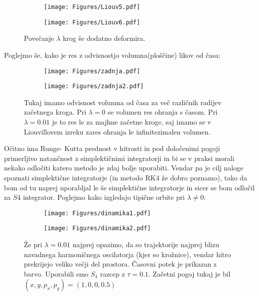 \documentclass{article}
\begin{document}
\begin{figure}[H]
\centering
\begin{subfigure}{.49\textwidth}
\texttt{[image: Figures/Liouv5.pdf]}
\end{subfigure}
\begin{subfigure}{.49\textwidth}
\texttt{[image: Figures/Liouv6.pdf]}
\end{subfigure}
\caption*{Povečanje $\lambda$ krog še dodatno deformira.}
\end{figure}
Poglejmo še, kako je res z odvisnostjo volumna(ploščine) likov od časa:
\begin{figure}[H]
\centering
\begin{subfigure}{.49\textwidth}
\texttt{[image: Figures/zadnja.pdf]}
\end{subfigure}
\begin{subfigure}{.49\textwidth}
\texttt{[image: Figures/zadnja2.pdf]}
\end{subfigure}
\caption*{Tukaj imamo odvisnost volumna od časa za več različnih radijev začetnega kroga. Pri $\lambda=0$ se volumen res ohranja s časom. Pri $\lambda=0.01$ je to res le za majhne začetne kroge, saj imamo se v Liouvillovem izreku zares ohranja le infinitezimalen volumen.}
\end{figure}

Očitno ima Runge- Kutta prednost v hitrosti in pod določenimi pogoji primerljivo natančnost z simplektičnimi integratorji in bi se v praksi morali nekako odločiti katero metodo je zdaj bolje uporabiti. Vendar pa je cilj naloge spoznati simplektične integratorje (in metodo RK4 že dobro poznamo), tako da bom od tu naprej uporabljal le še simplektične integratorje in sicer se bom odločil za $S4$ integrator. Poglejmo kako izgledajo tipične orbite pri $\lambda \neq 0$:

\begin{figure}[H]
\centering
\begin{subfigure}{.49\textwidth}
\texttt{[image: Figures/dinamika1.pdf]}
\end{subfigure}
\begin{subfigure}{.49\textwidth}
\texttt{[image: Figures/dinamika2.pdf]}
\end{subfigure}
\caption*{Že pri $\lambda=0.01$ najprej opazimo, da so trajektorije najprej blizu navadnega harmoničnega oscilatorja (kjer so krožnice), vendar hitro prekrijejo veliko večji del prostora. Časovni potek je prikazan z barvo. Uporabili smo $S_4$ razcep z $\tau=0.1$. Začetni pogoj tukaj je bil $(x,y,p_x,p_y) = (1,0,0,0.5)$}
\end{figure}
\end{document}
